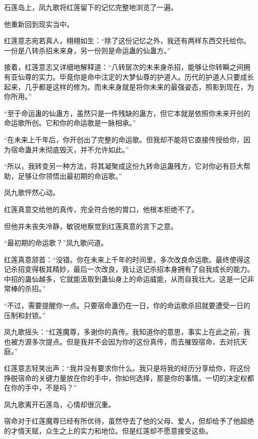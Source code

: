 
\begin{this_body}

石莲岛上，凤九歌将红莲留下的记忆完整地浏览了一遍。

他重新回到现实当中。

红莲意志宛若真人，栩栩如生：“除了这份记忆之外，我还有两样东西交托给你。一份是八转杀招未来身，另一份则是命运蛊的仙蛊方。”

接着，红莲意志又详细地解释道：“八转层次的未来身杀招，能够让你转瞬之间拥有亚仙尊的实力。毕竟你是命中注定的大梦仙尊的护道人。历代的护道人只要成长起来，几乎都是这样的修为。而未来身就是将你未来的最强姿态，照影到现在，为你所用。”

“至于命运蛊的仙蛊方，虽然只是一件残缺的蛊方，但它本就是依照你未来开创的命运歌所创。它和你的命运歌是一脉相承。”

“在未来上千年后，你开创出了完整的命运歌。但我却不能将它直接传授给你，因为宿命蛊并未彻底毁灭，并不允许如此。”

“所以，我转变另一种方法，将其凝聚成这份九转命运蛊残方，它对你必有巨大帮助，足够让你领悟出最初期的命运歌。”

凤九歌怦然心动。

红莲真意交给他的真传，完全符合他的胃口，他根本拒绝不了。

但他并未丧失冷静，敏锐地察觉到红莲真意的言下之意。

“最初期的命运歌？”凤九歌问道。

红莲真意颔首：“没错。你在未来上千年的时间里，多次改良命运歌。最终使得这记杀招变得极其精妙，最后一次改良，竟让这记杀招本身拥有了自我成长的能力。中招的蛊仙越多，它就能汲取到蛊仙身上的命运威能，从而自我壮大。这是一记非常棒的杀招。”

“不过，需要提醒你一点。只要宿命蛊仍在一日，你的命运歌杀招就要遭受一日的压制和封锁。”

凤九歌摇头：“红莲魔尊，多谢你的真传。我知道你的意思，事实上在此之前，我也被方源多次提点。但是我并不会因为你的这份真传，而去摧毁宿命，去对抗天庭。”

红莲意志轻笑出声：“我并没有要求你什么。我只是将我的经历分享给你，将这份挣脱宿命的关键力量放在你的手中，你如何选择，那是你的事情。一切的决定权都在你的手中，不是吗？”

凤九歌离开石莲岛，心情却很沉重。

宿命对于红莲魔尊已经有所优待，虽然夺去了他的父母、爱人，但却给予了他超绝的才情天赋，众生之上的实力和地位。但是红莲却不愿意接受这些。


\end{this_body}
